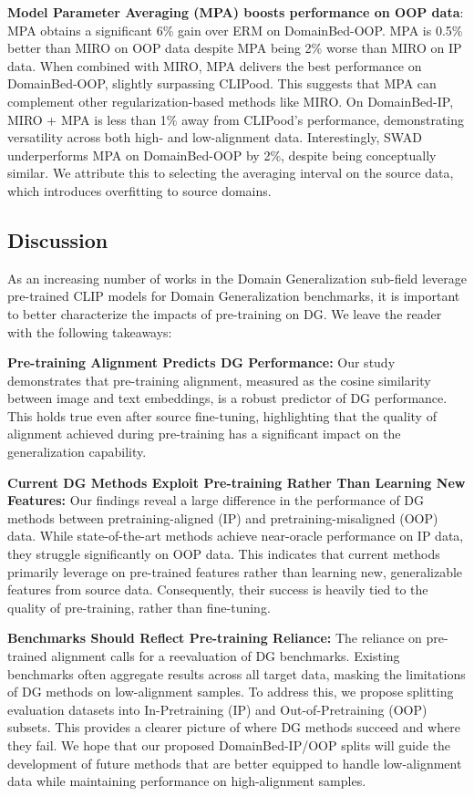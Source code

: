 \documentclass{article} %
\begin{document}
\textbf{Model Parameter Averaging (MPA) boosts performance on OOP data}: MPA obtains a significant 6\% gain over ERM on DomainBed-OOP. MPA is 0.5\% better than MIRO on OOP data despite MPA being 2\% worse than MIRO on IP data.  When combined with MIRO, MPA delivers the best performance on DomainBed-OOP, slightly surpassing CLIPood. This suggests that MPA can complement other regularization-based methods like MIRO. On DomainBed-IP, MIRO + MPA is less than 1\% away from CLIPood’s performance, demonstrating versatility across both high- and low-alignment data. Interestingly, SWAD underperforms MPA on DomainBed-OOP by 2\%, despite being conceptually similar. We attribute this to selecting the averaging interval on the source data, which introduces overfitting to source domains.




\subsection{Discussion}


As an increasing number of works in the Domain Generalization sub-field leverage pre-trained CLIP models for Domain Generalization benchmarks, it is important to better characterize the impacts of pre-training on DG. We leave the reader with the following takeaways:

\noindent\textbf{Pre-training Alignment Predicts DG Performance:} Our study demonstrates that pre-training alignment, measured as the cosine similarity between image and text embeddings, is a robust predictor of DG performance. This holds true even after source fine-tuning, highlighting that the quality of alignment achieved during pre-training has a significant impact on the generalization capability.

\noindent\textbf{Current DG Methods Exploit Pre-training Rather Than Learning New Features:}  Our findings reveal a large difference in the performance of DG methods between pretraining-aligned (IP) and pretraining-misaligned (OOP) data. While state-of-the-art methods achieve near-oracle performance on IP data, they struggle significantly on OOP data. This indicates that current methods primarily leverage on pre-trained features rather than learning new, generalizable features from source data. Consequently, their success is heavily tied to the quality of pre-training, rather than fine-tuning.

\noindent\textbf{Benchmarks Should Reflect Pre-training Reliance:} The reliance on pre-trained alignment calls for a reevaluation of DG benchmarks. Existing benchmarks often aggregate results across all target data, masking the limitations of DG methods on low-alignment samples. To address this, we propose splitting evaluation datasets into In-Pretraining (IP) and Out-of-Pretraining (OOP) subsets. This provides a clearer picture of where DG methods succeed and where they fail.  We hope that our proposed DomainBed-IP/OOP splits will guide the development of future methods that are better equipped to handle low-alignment data while maintaining performance on high-alignment samples.
\end{document}
